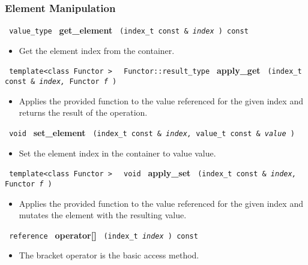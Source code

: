 \subsubsection{Element Manipulation}

\noindent
\texttt{%
value\_type
}
\newline
\textbf{get\_element}%
\texttt{%
(index\_t const \&
\textit{index}%
) const
}

\begin{itemize}
\item
Get the element index from the container.
\end{itemize}

\noindent
\texttt{%
template<class Functor >
}
\texttt{%
Functor::result\_type
}
\newline
\textbf{apply\_get}%
\texttt{%
(index\_t const \&
\textit{index,}%
Functor
\textit{f}%
)
}

\begin{itemize}
\item
Applies the provided function to the value referenced for the given index and returns the result of the operation.
\end{itemize}

\noindent
\texttt{%
void
}
\newline
\textbf{set\_element}%
\texttt{%
(index\_t const \&
\textit{index,}%
value\_t const \&
\textit{value}%
)
}

\begin{itemize}
\item
Set the element index in the container to value value.
\end{itemize}

\noindent
\texttt{%
template<class Functor >
}
\texttt{%
void
}
\newline
\textbf{apply\_set}%
\texttt{%
(index\_t const \&
\textit{index,}%
Functor
\textit{f}%
)
}

\begin{itemize}
\item
Applies the provided function to the value referenced for the given index and mutates the element with the resulting value.
\end{itemize}

\noindent
\texttt{%
reference
}
\newline
\textbf{operator[]}%
\texttt{%
(index\_t
\textit{index}%
) const
}

\begin{itemize}
\item
The bracket operator is the basic access method.
\end{itemize}

